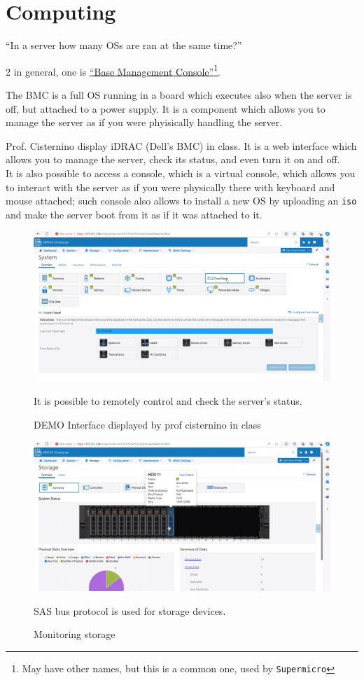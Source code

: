 \chapter{Computing}
\begin{center}
   ``In a server how many OSs are ran at the same time?''
\end{center}
2 in general, one is \ul{``Base Management Console''}\footnote{May have other names, but this is a common one, used by \texttt{Supermicro}}.

The BMC is a full OS running in a board which executes also when the server is off, but attached to a power supply. It is a component which allows you to manage the server as if you were phyisically handling the server.

Prof. Cisternino display iDRAC (Dell's BMC) in class. It is a web interface which allows you to manage the server, check its status, and even turn it on and off. \\
It is also possible to access a console, which is a virtual console, which allows you to interact with the server as if you were physically there with keyboard and mouse attached;
such console also allows to install a new OS by uploading an \texttt{iso} and make the server boot from it as if it was attached to it.
\begin{figure}[htbp]
   \centering
   \includegraphics{images/monitoring_servers.png}
   \caption{DEMO Interface displayed by prof cisternino in class}
   \label{fig:monitoring_servers}
   It is possible to remotely control and check the server's status.
\end{figure}

\begin{figure}[htbp]
   \centering
   \includegraphics{images/monitoring_servers2.png}
   \caption{Monitoring storage}
   \label{fig:monitoring_servers2}
   SAS bus protocol is used for storage devices.
\end{figure}

